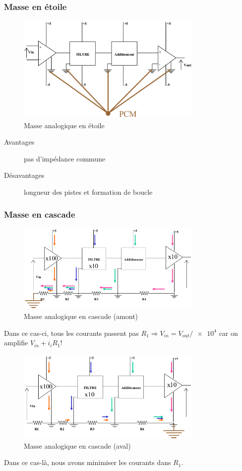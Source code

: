 \subsubsection{Masse en étoile}
\begin{figure}[H] 
	\centering 
	\includegraphics[width=0.8\textwidth,height=10\baselineskip,keepaspectratio]{ch3/image27} 
	\caption{Masse analogique en étoile} 
\end{figure}
\begin{description}
	\item[Avantages] pas d'impédance commune
	\item[Désavantages] longueur des pistes et formation de boucle
\end{description}
\subsubsection{Masse en cascade}
\begin{figure}[H] 
	\centering 
	\includegraphics[width=0.8\textwidth,height=10\baselineskip,keepaspectratio]{ch3/image28} 
	\caption{Masse analogique en cascade (amont)} 
\end{figure}
Dans ce cas-ci, tous les courants passent pas \(R_1 \Rightarrow V_{in}=V_{out}/\num{e4}\) car on amplifie \(V_{in}+ i_iR_1\)!
\begin{figure}[H] 
	\centering 
	\includegraphics[width=0.8\textwidth,height=10\baselineskip,keepaspectratio]{ch3/image29} 
	\caption{Masse analogique en cascade (aval)} 
\end{figure}
Dans ce cas-là, nous avons minimiser les courants dans \(R_1\).
